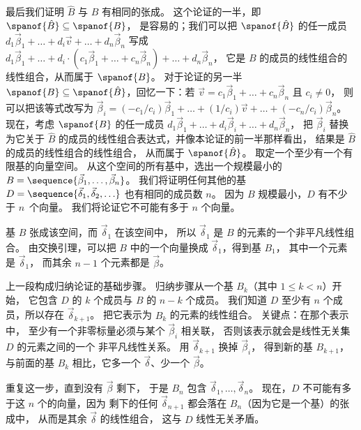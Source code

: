 \begin{answer}
\begin{exparts}
          最后我们证明 $\hat{B}$ 与 $B$ 有相同的张成。
          这个论证的一半，即
          $\spanof{\smash{\hat{B}}}\subseteq\spanof{B}$，
          是容易的；我们可以把 $\spanof{\smash{\hat{B}}}$ 的任一成员
          $d_1\vec{\beta}_1+\dots+d_i\vec{v}+\dots+d_n\vec{\beta}_n$
          写成
          $
          d_1\vec{\beta}_1+\dots
          +d_i\cdot(c_1\vec{\beta}_1+\dots+c_n\vec{\beta}_n)
          +\dots+d_n\vec{\beta}_n
          $，
          它是 $B$ 的成员的线性组合的线性组合，从而属于 $\spanof{B}$。
          对于论证的另一半 $\spanof{B}\subseteq\spanof{\smash{\hat{B}}}$，回忆一下：若
          $\vec{v}=c_1\vec{\beta}_1+\dots+c_n\vec{\beta}_n$ 且 $c_i\neq 0$，
          则可以把该等式改写为
          $\vec{\beta}_i=(-c_1/c_i)\vec{\beta}_1+\dots+(1/c_i)\vec{v}+\dots
          +(-c_n/c_i)\vec{\beta}_n$。
          现在，考虑 $\spanof{B}$ 的任一成员
          $d_1\vec{\beta}_1+\dots+d_i\vec{\beta}_i+\dots+d_n\vec{\beta}_n$，
          把 $\vec{\beta}_i$ 替换为它关于 $\hat{B}$ 的成员的线性组合表达式，并像本论证的前一半那样看出，
          结果是 $\hat{B}$ 的成员的线性组合的线性组合，
          从而属于 $\spanof{\smash{\hat{B}}}$。
         \partsitem 取定一个至少有一个有限基的向量空间。
           从这个空间的所有基中，选出一个规模最小的
           \( B=\sequence{\vec{\beta}_1,\dots,\vec{\beta}_n} \)。
           我们将证明任何其他的基
           \( D=\smash{\sequence{\vec{\delta}_1,\vec{\delta}_2,\ldots}} \)
           也有相同的成员数 $n$。
           因为 \( B \) 规模最小，\( D \) 有不少于 \( n \)~个向量。
           我们将论证它不可能有多于 \( n \) 个向量。

           基 \( B \) 张成该空间，而 \( \vec{\delta}_1 \)
           在该空间中，
           所以 \( \vec{\delta}_1 \) 是 \( B \) 的元素的一个非平凡线性组合。
           由交换引理，可以把 \( B \) 中的一个向量换成
           \( \vec{\delta}_1 \)，得到基 \( B_1 \)，
           其中一个元素是
           \( \vec{\delta}_1 \)，
           而其余 \( n-1 \) 个元素都是 \( \vec{\beta} \)。

           上一段构成归纳论证的基础步骤。
           归纳步骤从一个基 \( B_k \)（其中 \( 1\leq k<n \)）开始，
           它包含 \( D \) 的 \( k \) 个成员与 \( B \) 的 \( n-k \) 个成员。
           我们知道 \( D \) 至少有 \( n \) 个成员，所以存在
           \( \vec{\delta}_{k+1} \)。
           把它表示为 \( B_k \) 的元素的线性组合。
           关键点：在那个表示中，
           至少有一个非零标量必须与某个 \( \vec{\beta}_i \) 相关联，
           否则该表示就会是线性无关集 \( D \) 的元素之间的一个
           非平凡线性关系。
           用 \( \vec{\delta}_{k+1} \) 换掉 \( \vec{\beta}_i \)，
           得到新的基
           \( B_{k+1} \)，与前面的基 \( B_k \) 相比，它多一个 \( \vec{\delta} \)、少一个
           \( \vec{\beta} \)。

           重复这一步，直到没有 \( \vec{\beta} \) 剩下，
           于是 \( B_n \) 包含  
           $\vec{\delta}_1,\dots,\vec{\delta}_n$。
           现在，\( D \) 不可能有多于这 \( n \) 个的向量，因为
           剩下的任何 \( \vec{\delta}_{n+1} \) 都会落在
           \( B_n \)（因为它是一个基）的张成中，
           从而是其余 $\vec{\delta}$ 的线性组合，
           这与 $D$ 线性无关矛盾。
      \end{exparts}
      \end{answer}

